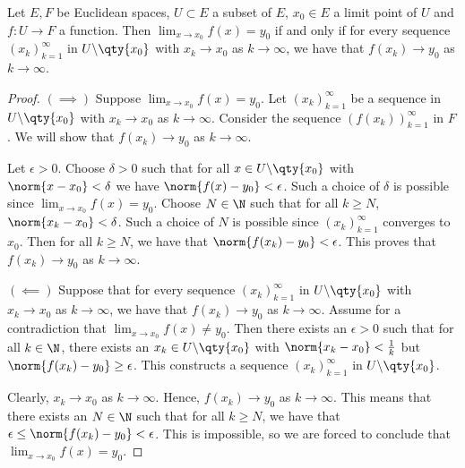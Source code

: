 \begin{proposition}
  \label{thm:limseq}
   Let \( E, F \) be Euclidean spaces, \( U\subset E \) a subset of \( E \), \( x_0\in E \) a limit point of \( U \) and \( f:U\to F \) a function. Then \( \lim_{x\to x_0}f(x)=y_0 \) if and only if for every sequence \( (x_k)_{k=1}^\infty \) in \( U\backslash\qty{x_0} \) with \( x_k\to x_0 \) as \( k\to\infty \), we have that \( f(x_k)\to y_0 \) as \( k\to\infty \).
 \end{proposition}
 \begin{proof}
   \( (\implies) \) Suppose \( \lim_{x\to x_0}f(x)=y_0 \). Let \( (x_k)_{k=1}^\infty \) be a sequence in \( U\backslash\qty{x_0} \) with \( x_k\to x_0 \) as \( k\to\infty \). Consider the sequence \( (f(x_k))_{k=1}^\infty \) in \( F \). We will show that \( f(x_k)\to y_0 \) as \( k\to\infty \).

   \vspace{3mm}

   Let \( \epsilon>0 \). Choose \( \delta>0 \) such that for all \( x\in U\backslash\qty{x_0} \) with \( \norm{x-x_0}<\delta \) we have \( \norm{f(x)-y_0}<\epsilon \). Such a choice of \( \delta \) is possible since \( \lim_{x\to x_0}f(x)=y_0 \).  Choose \( N\in\N \) such that for all \( k\geq N \), \( \norm{x_k-x_0}<\delta \). Such a choice of \( N \) is possible since \( (x_k)_{k=1}^\infty \) converges to \( x_0 \). Then for all \( k\geq N \), we have that \( \norm{f(x_k)-y_0}<\epsilon \). This proves that \( f(x_k)\to y_0 \) as \( k\to\infty \).

   \vspace{3mm}

   \( (\impliedby) \) Suppose that for every sequence \( (x_k)_{k=1}^\infty \) in \( U\backslash\qty{x_0} \) with \( x_k\to x_0 \) as \( k\to\infty \), we have that \( f(x_k)\to y_0 \) as \( k\to\infty \). Assume for a contradiction that \( \lim_{x\to x_0}f(x)\neq y_0 \). Then there exists an \( \epsilon>0 \) such that for all \( k\in\N \), there exists an \( x_k\in U\backslash\qty{x_0} \) with \( \norm{x_k-x_0}<\frac{1}{k} \) but \( \norm{f(x_k)-y_0}\geq \epsilon \). This constructs a sequence \( (x_k)_{k=1}^\infty \) in \( U\backslash\qty{x_0} \).

   \vspace{3mm}

   Clearly, \( x_k\to x_0 \) as \( k\to\infty \). Hence, \( f(x_k)\to y_0 \) as \( k\to\infty \). This means that there exists an \( N\in\N \) such that for all \( k\geq N \), we have that \( \epsilon\leq \norm{f(x_k)-y_0}<\epsilon \). This is impossible, so we are forced to conclude that \( \lim_{x\to x_0}f(x)= y_0 \).
 \end{proof}

